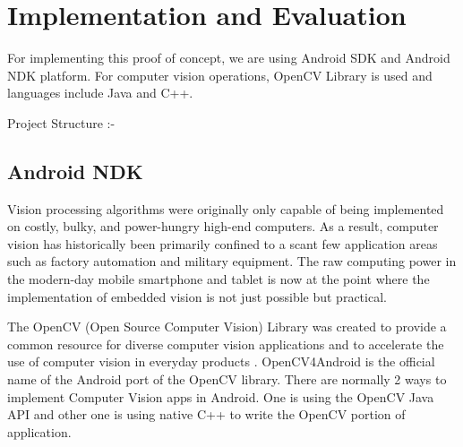 \section{Implementation and Evaluation}

For implementing this proof of concept, we are using Android SDK and Android NDK platform. For computer vision operations, OpenCV Library is used and languages include Java and C++. 

Project Structure :-

\begin{figure}[H]
    \centering\small
    \begin{minipage}[t]{\linewidth}
    \end{minipage}
\end{figure}

\subsection{Android NDK}

Vision processing algorithms were originally only capable of being implemented on costly, bulky, and power-hungry high-end computers. As a result, computer vision has historically been primarily confined to a scant few application areas such as factory automation and military equipment. The raw computing power in the modern-day mobile smartphone and tablet is now at the point where the implementation of embedded vision is not just possible but practical.

The OpenCV (Open Source Computer Vision) Library was created to provide a common resource for diverse computer vision applications and to accelerate the use of computer vision in everyday products \cite{lane5}. OpenCV4Android is the official name of the Android port of the OpenCV library. There are normally 2 ways to implement Computer Vision apps in Android. One is using the OpenCV Java API and other one is using native C++ to write the OpenCV portion of application. 

